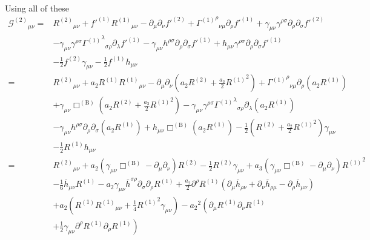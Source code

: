 \documentclass[a4paper, 11pt, titlepage, twoside]{report}
\newcommand{\recip}[1]{\ensuremath{\frac{1}{#1}}}
\begin{document}
Using all of these
\begin{align}
{\mathcal{G}^{(2)}}_{\mu\nu} = {} & {R^{(2)}}_{\mu\nu} + f'^{(1)}{R^{(1)}}_{\mu\nu} - \partial_\mu\partial_\nu f'^{(2)} + {{\Gamma^{(1)}}^\rho}_{\nu\mu}\partial_\rho f'^{(1)} + \gamma_{\mu\nu}\gamma^{\rho\sigma}\partial_\rho\partial_\sigma f'^{(2)} \nonumber \\
 & - {} \gamma_{\mu\nu}\gamma^{\rho\sigma}{{\Gamma^{(1)}}^\lambda}_{\sigma\rho}\partial_\lambda f'^{(1)} - \gamma_{\mu\nu}h^{\rho\sigma}\partial_\rho\partial_\sigma f'^{(1)} + h_{\mu\nu}\gamma^{\rho\sigma}\partial_\rho\partial_\sigma f'^{(1)} \nonumber \\
 & - {} \recip{2}f^{(2)}\gamma_{\mu\nu} - \recip{2}f^{(1)}h_{\mu\nu} \nonumber \\
 = {} & {R^{(2)}}_{\mu\nu} + a_2R^{(1)}{R^{(1)}}_{\mu\nu} - \partial_\mu\partial_\nu \left(a_2R^{(2)} + \frac{a_3}{2}{R^{(1)}}^2\right) + {{\Gamma^{(1)}}^\rho}_{\nu\mu}\partial_\rho \left(a_2R^{(1)}\right) \nonumber \\
 & + {} \gamma_{\mu\nu}\Box^{(\mathrm{B})} \left(a_2R^{(2)} + \frac{a_3}{2}{R^{(1)}}^2\right) - \gamma_{\mu\nu}\gamma^{\rho\sigma}{{\Gamma^{(1)}}^\lambda}_{\sigma\rho}\partial_\lambda\left(a_2R^{(1)}\right) \nonumber \\
 & - {} \gamma_{\mu\nu}h^{\rho\sigma}\partial_\rho\partial_\sigma\left(a_2R^{(1)}\right) + h_{\mu\nu}\Box^{(\mathrm{B})}\left(a_2R^{(1)}\right) - \recip{2}\left(R^{(2)} + \frac{a_2}{2}{R^{(1)}}^2\right)\gamma_{\mu\nu} \nonumber \\
 & - {} \recip{2}R^{(1)}h_{\mu\nu} \nonumber \\
 = {} & {R^{(2)}}_{\mu\nu} + a_2\left(\gamma_{\mu\nu}\Box^{(\mathrm{B})} - \partial_\mu\partial_\nu\right)R^{(2)} - \recip{2}R^{(2)}\gamma_{\mu\nu} + a_3\left(\gamma_{\mu\nu}\Box^{(\mathrm{B})} - \partial_\mu\partial_\nu\right){R^{(1)}}^2 \nonumber \\
 & - {} \recip{6}\overline{h}_{\mu\nu}R^{(1)} - a_2\gamma_{\mu\nu}\overline{h}^{\sigma\rho}\partial_\sigma\partial_\rho R^{(1)} + \frac{a_2}{2} \partial^\rho R^{(1)} \left(\partial_\mu\overline{h}_{\rho\nu} + \partial_\nu\overline{h}_{\rho\mu} - \partial_\rho\overline{h}_{\mu\nu}\right) \nonumber \\
 & + {} a_2\left(R^{(1)}{R^{(1)}}_{\mu\nu} + \recip{4}{R^{(1)}}^2\gamma_{\mu\nu}\right) - {a_2}^2\left(\partial_\mu R^{(1)}\partial_\nu R^{(1)} \right. \nonumber \\
 & + \left. \recip{2} \gamma_{\mu\nu}\partial^\rho R^{(1)}\partial_\rho R^{(1)}\right)
\end{align}
\end{document}
